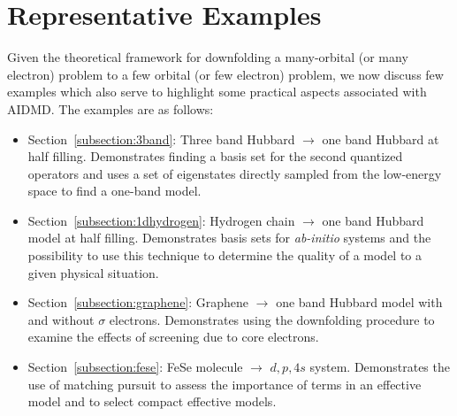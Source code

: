 \section{Representative Examples}

Given the theoretical framework for downfolding a many-orbital (or many electron) problem to a 
few orbital (or few electron) problem, we now discuss few examples which also serve to highlight some practical aspects 
associated with AIDMD. 
The examples are as follows:
\begin{itemize}
\item Section~\ref{subsection:3band}: Three band Hubbard $\rightarrow$ one band Hubbard at half filling. Demonstrates finding a basis set for the second quantized operators and uses a set of eigenstates directly sampled from the low-energy space to find a one-band model.
\item Section~\ref{subsection:1dhydrogen}: Hydrogen chain $\rightarrow$ one band Hubbard model at half filling. Demonstrates basis sets for {\it ab-initio} systems and the possibility to use this technique to determine the quality of a model to a given physical situation.
\item Section~\ref{subsection:graphene}: Graphene $\rightarrow$ one band Hubbard model with and without $\sigma$ electrons. Demonstrates using the downfolding procedure to examine the effects of screening due to core electrons. 
\item Section~\ref{subsection:fese}: FeSe molecule $\rightarrow$ $d,p,4s$ system. Demonstrates the use of matching pursuit to assess the importance of terms in an effective model and to select compact effective models.
\end{itemize}



